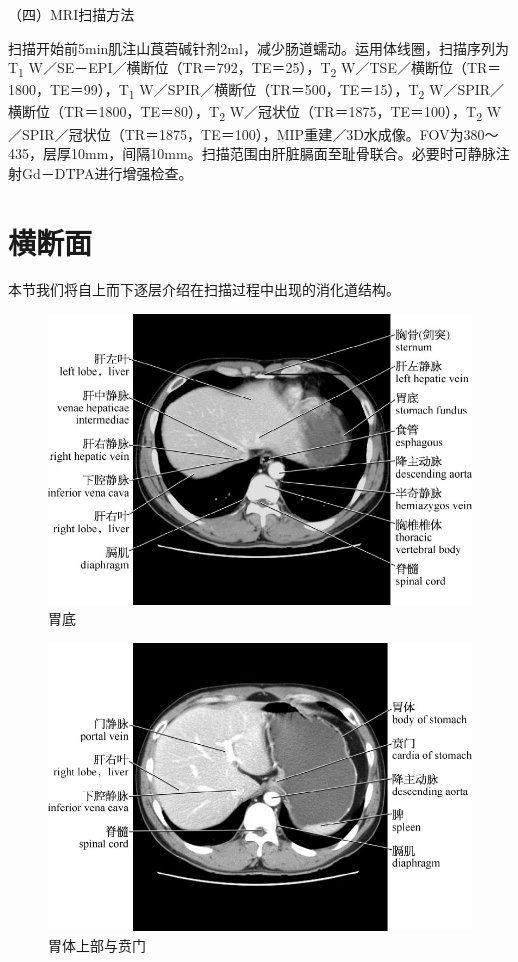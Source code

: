 （四）MRI扫描方法

扫描开始前5min肌注山莨菪碱针剂2ml，减少肠道蠕动。运用体线圈，扫描序列为T\textsubscript{1}
W／SE－EPI／横断位（TR＝792，TE＝25），T\textsubscript{2}
W／TSE／横断位（TR＝1800，TE＝99），T\textsubscript{1}
W／SPIR／横断位（TR＝500，TE＝15），T\textsubscript{2}
W／SPIR／横断位（TR＝1800，TE＝80），T\textsubscript{2}
W／冠状位（TR＝1875，TE＝100），T\textsubscript{2}
W／SPIR／冠状位（TR＝1875，TE＝100），MIP重建／3D水成像。FOV为380～435，层厚10mm，间隔10mm。扫描范围由肝脏膈面至耻骨联合。必要时可静脉注射Gd－DTPA进行增强检查。

\section{横断面}

本节我们将自上而下逐层介绍在扫描过程中出现的消化道结构。

\begin{figure}[!htbp]
 \centering
 \includegraphics{./images/Image00166.jpg}
 \captionsetup{justification=centering}
 \caption{胃底}
  \end{figure} 
 \FloatBarrier

\begin{figure}[!htbp]
 \centering
 \includegraphics{./images/Image00167.jpg}
 \captionsetup{justification=centering}
 \caption{胃体上部与贲门}
  \end{figure} 
 \FloatBarrier

